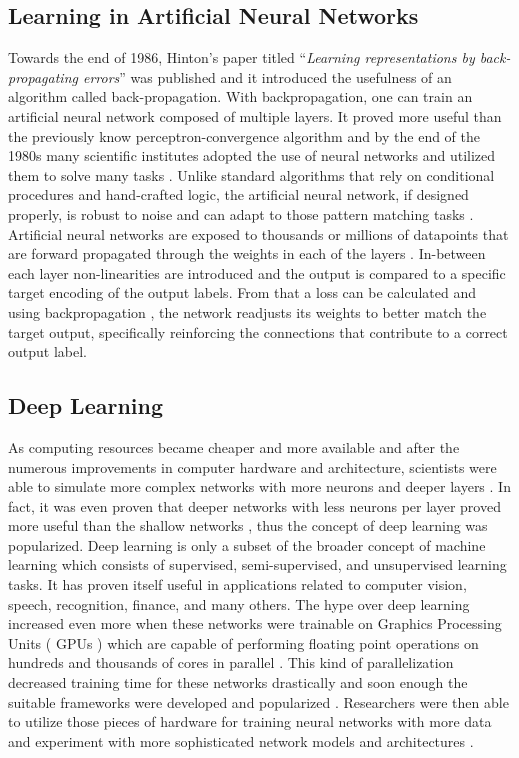 \subsection{Learning in Artificial Neural Networks}
Towards the end of 1986, Hinton’s paper titled “\textit{Learning representations by back-propagating errors}”\cite{rumelhart1986learning} was published and it introduced the usefulness of an algorithm called back-propagation. With backpropagation, one can train an artificial neural network composed of multiple layers. It proved more useful than the previously know perceptron-convergence algorithm \cite{widrow199030} and by the end of the 1980s many scientific institutes adopted the use of neural networks and utilized them to solve many tasks \cite{pao1989adaptive}. Unlike standard algorithms that rely on conditional procedures and hand-crafted logic, the artificial neural network, if designed properly, is robust to noise and can adapt to those pattern matching tasks \cite{wang1994robustness}. Artificial neural networks are exposed to thousands or millions of datapoints that are forward propagated through the weights in each of the layers \cite{lecun2015deep}. In-between each layer non-linearities are introduced and the output is compared to a specific target encoding of the output labels. From that a loss can be calculated and using backpropagation \cite{rumelhart1986learning}, the network readjusts its weights to better match the target output, specifically reinforcing the connections that contribute to a correct output label.

\subsection{Deep Learning}
As computing resources became cheaper and more available and after the numerous improvements in computer hardware and architecture, scientists were able to simulate more complex networks with more neurons and deeper layers \cite{resnet}. In fact, it was even proven that deeper networks with less neurons per layer proved more useful than the shallow networks \cite{szegedy2015going}, thus the concept of deep learning was popularized. Deep learning is only a subset of the broader concept of machine learning which consists of supervised, semi-supervised, and unsupervised learning tasks. It has proven itself useful in applications related to computer vision, speech, recognition, finance, and many others. The hype over deep learning increased even more when these networks were trainable on Graphics Processing Units ( GPUs ) which are capable of performing floating point operations on hundreds and thousands of cores in parallel \cite{raina2009large}. This kind of parallelization decreased training time for these networks drastically \cite{raina2009large} and soon enough the suitable frameworks were developed and popularized \cite{tensorflow, theano}. Researchers were then able to utilize those pieces of hardware for training neural networks with more data and experiment with more sophisticated network models and architectures \cite{densenet, raina2009large,resnet}. 

